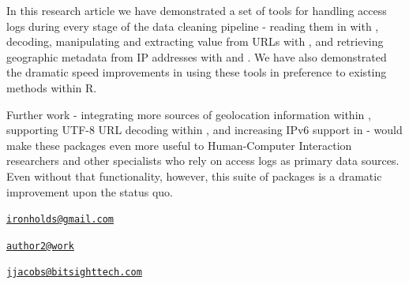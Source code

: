 In this research article we have demonstrated a set of tools for
handling access logs during every stage of the data cleaning pipeline -
reading them in with , decoding, manipulating and
extracting value from URLs with , and retrieving
geographic metadata from IP addresses with  and
. We have also demonstrated the dramatic speed
improvements in using these tools in preference to existing methods
within R.

Further work - integrating more sources of geolocation information
within , supporting UTF-8 URL decoding within
, and increasing IPv6 support in  - would
make these packages even more useful to Human-Computer Interaction
researchers and other specialists who rely on access logs as primary
data sources. Even without that functionality, however, this suite of
packages is a dramatic improvement upon the status quo.



\address{%
Oliver Keyes\\
Wikimedia Foundation\\
149 New Montgomery Street, 6th floor\\ San Francisco, CA, 94105, USA\\
}
\href{mailto:ironholds@gmail.com}{\nolinkurl{ironholds@gmail.com}}

\address{%
Bob Rudis\\
Rapid7\\
line 1\\ line 2\\
}
\href{mailto:author2@work}{\nolinkurl{author2@work}}

\address{%
Jay Jacobs\\
BitSight\\
line 1\\ line 2\\
}
\href{mailto:jjacobs@bitsighttech.com}{\nolinkurl{jjacobs@bitsighttech.com}}


